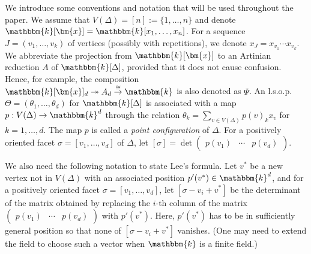 We introduce some conventions and notation that will be used throughout the paper.
We assume that $V(\Delta)=[n]:=\{1,\ldots,n\}$ and denote $\mathbbm{k}[\bm{x}]=\mathbbm{k}[x_1,\ldots,x_n]$. For a sequence $J=(v_1,\ldots,v_k)$ of vertices (possibly with repetitions), we denote $x_J=x_{v_1}\cdots x_{v_k}$.
We abbreviate the projection from $\mathbbm{k}[\bm{x}]$ to an Artinian reduction $A$ of $\mathbbm{k}[\Delta]$, provided that it does not cause confusion.
Hence, for example, the composition $\mathbbm{k}[\bm{x}]_d \twoheadrightarrow A_d \overset{\cong}{\rightarrow} \mathbbm{k}$ is also denoted as $\Psi$.
An l.s.o.p.~$\Theta=(\theta_1,\ldots,\theta_d)$ for $\mathbbm{k}[\Delta]$ is associated with a map $p:V(\Delta) \rightarrow \mathbbm{k}^d$ through the relation $\theta_k=\sum_{v\in V(\Delta)} p(v)_k x_v$ for $k=1,\ldots,d$. The map $p$ is called a \emph{point configuration} of $\Delta$.
For a positively oriented facet $\sigma=[v_1,\ldots,v_d]$ of $\Delta$, let $[\sigma]=\det \begin{pmatrix} p(v_1) & \cdots & p(v_d) \end{pmatrix}$.

We also need the following notation to state Lee's formula.
Let $v^*$ be a new vertex not in $V(\Delta)$ with an associated position $p'(v^*) \in \mathbbm{k}^d$, and for a positively oriented facet $\sigma=[v_1,\ldots,v_d]$, let $[\sigma-v_i+v^*]$ be the determinant of the matrix obtained by replacing the $i$-th column of the matrix $\begin{pmatrix} p(v_1) & \cdots & p(v_d) \end{pmatrix}$ with $p'(v^*)$.
Here, $p'(v^*)$ has to be in sufficiently general position so that none of $[\sigma-v_i+v^*]$ vanishes. (One may need to extend the field to choose such a vector when $\mathbbm{k}$ is a finite field.)

